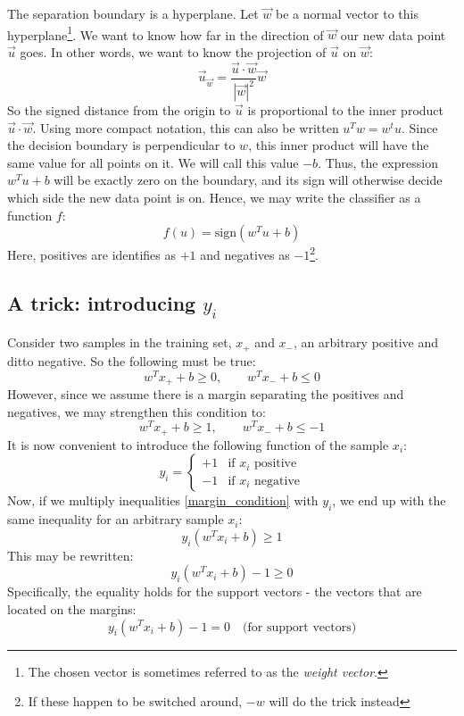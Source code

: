 \documentclass[12pt, a4paper]{article}
\numberwithin{equation}{section}
\begin{document}
The separation boundary is a hyperplane. Let $\vec{w}$ be a normal vector to this hyperplane\footnote{The chosen vector is sometimes referred to as the \textit{weight vector}.}. We want to know how far in the direction of $\vec{w}$ our new data point $\vec{u}$ goes. In other words, we want to know the projection of $\vec{u}$ on $\vec{w}$:
\begin{equation}
\vec{u}_{\vec{w}}=\frac{\vec{u}\cdot\vec{w}}{|\vec{w}|^2}\vec{w}
\end{equation}
So the signed distance from the origin to $\vec{u}$ is proportional to the inner product $\vec{u}\cdot\vec{w}$. Using more compact notation, this can also be written $u^T w=w^t u$. Since the decision boundary is perpendicular to $w$, this inner product will have the same value for all points on it. We will call this value $-b$. Thus, the expression $w^T u+b$ will be exactly zero on the boundary, and its sign will otherwise decide which side the new data point is on. Hence, we may write the classifier as a function $f$:
\begin{equation}
\label{classifier}
f(u)=\textrm{sign}(w^T u+b)
\end{equation}
Here, positives are identifies as $+1$ and negatives as $-1$\footnote{If these happen to be switched around, $-w$ will do the trick instead}.

\subsection{A trick: introducing $y_i$}
Consider two samples in the training set, $x_+$ and $x_-$, an arbitrary positive and ditto negative. So the following must be true:
\begin{equation}
w^T x_+ +b\ge 0,\qquad w^T x_- +b\le 0
\end{equation}
However, since we assume there is a margin separating the positives and negatives, we may strengthen this condition to:
\begin{equation}
\label{margin_condition}
w^T x_+ +b\ge 1,\qquad w^T x_- +b\le -1
\end{equation}
It is now convenient to introduce the following function of the sample $x_i$:
\begin{equation}
y_i=
\begin{cases}
+1 & \textrm{if } x_i \textrm{ positive} \\
-1 & \textrm{if } x_i \textrm{ negative}
\end{cases}
\end{equation}
Now, if we multiply inequalities \ref{margin_condition} with $y_i$, we end up with the same inequality for an arbitrary sample $x_i$:
\begin{equation}
y_i(w^T x_i + b)\ge 1
\end{equation}
This may be rewritten:
\begin{equation}
y_i(w^T x_i + b)-1\ge 0
\end{equation}
Specifically, the equality holds for the support vectors - the vectors that are located on the margins:
\begin{equation}
\label{support_vector_condition}
y_i(w^T x_i + b)-1=0\quad\textrm{(for support vectors)}
\end{equation}
\end{document}
